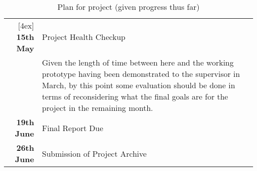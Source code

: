 \begin{table}[!h]
\begin{tabularx}{0.9\textwidth}{ r | X }
                           [4ex]
    \textbf{15th May}      & Project Health Checkup \\
                           & Given the length of time between here and the working prototype having been demonstrated to the supervisor in March, by this point some evaluation should be done in terms of reconsidering what the final goals are for the project in the remaining month. \\
                           [4ex]
    \textbf{19th June}     & Final Report Due \\
                           [4ex]
    \textbf{26th June}     & Submission of Project Archive
  \end{tabularx}
  \vspace{10 mm}
  \caption{
    Plan for project (given progress thus far)
  }
  \label{table:project_plan}
\end{table}
